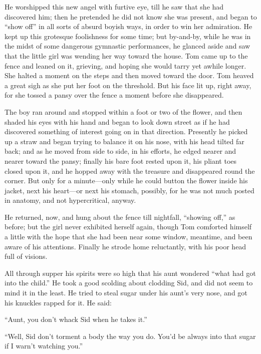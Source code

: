 \documentclass{book}
\begin{document}
He worshipped this new angel with furtive eye, till he saw that she had discovered him; then he pretended he did not know she was present, and began to “show off” in all sorts of absurd boyish ways, in order to win her admiration. He kept up this grotesque foolishness for some time; but by-and-by, while he was in the midst of some dangerous gymnastic performances, he glanced aside and saw that the little girl was wending her way toward the house. Tom came up to the fence and leaned on it, grieving, and hoping she would tarry yet awhile longer. She halted a moment on the steps and then moved toward the door. Tom heaved a great sigh as she put her foot on the threshold. But his face lit up, right away, for she tossed a pansy over the fence a moment before she disappeared.

The boy ran around and stopped within a foot or two of the flower, and then shaded his eyes with his hand and began to look down street as if he had discovered something of interest going on in that direction. Presently he picked up a straw and began trying to balance it on his nose, with his head tilted far back; and as he moved from side to side, in his efforts, he edged nearer and nearer toward the pansy; finally his bare foot rested upon it, his pliant toes closed upon it, and he hopped away with the treasure and disappeared round the corner. But only for a minute—only while he could button the flower inside his jacket, next his heart—or next his stomach, possibly, for he was not much posted in anatomy, and not hypercritical, anyway.

He returned, now, and hung about the fence till nightfall, “showing off,” as before; but the girl never exhibited herself again, though Tom comforted himself a little with the hope that she had been near some window, meantime, and been aware of his attentions. Finally he strode home reluctantly, with his poor head full of visions.

All through supper his spirits were so high that his aunt wondered “what had got into the child.” He took a good scolding about clodding Sid, and did not seem to mind it in the least. He tried to steal sugar under his aunt’s very nose, and got his knuckles rapped for it. He said:

“Aunt, you don’t whack Sid when he takes it.”

“Well, Sid don’t torment a body the way you do. You’d be always into that sugar if I warn’t watching you.”
\end{document}
